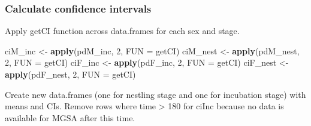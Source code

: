 \documentclass[]{article}
\newenvironment{Shaded}{\begin{snugshade}}{\end{snugshade}}
\newcommand{\DataTypeTok}[1]{\textcolor[rgb]{0.13,0.29,0.53}{#1}}
\newcommand{\DecValTok}[1]{\textcolor[rgb]{0.00,0.00,0.81}{#1}}
\newcommand{\KeywordTok}[1]{\textcolor[rgb]{0.13,0.29,0.53}{\textbf{#1}}}
\newcommand{\NormalTok}[1]{#1}
\newcommand{\StringTok}[1]{\textcolor[rgb]{0.31,0.60,0.02}{#1}}
\begin{document}
\hypertarget{calculate-confidence-intervals}{%
\subsubsection{Calculate confidence
intervals}\label{calculate-confidence-intervals}}

Apply getCI function across data.frames for each sex and stage.

\begin{Shaded}
\begin{Highlighting}[]
\NormalTok{ciM_inc <-}\StringTok{ }\KeywordTok{apply}\NormalTok{(pdM_inc, }\DecValTok{2}\NormalTok{, }\DataTypeTok{FUN =}\NormalTok{ getCI)}
\NormalTok{ciM_nest <-}\StringTok{ }\KeywordTok{apply}\NormalTok{(pdM_nest, }\DecValTok{2}\NormalTok{, }\DataTypeTok{FUN =}\NormalTok{ getCI)}
\NormalTok{ciF_inc <-}\StringTok{ }\KeywordTok{apply}\NormalTok{(pdF_inc, }\DecValTok{2}\NormalTok{, }\DataTypeTok{FUN =}\NormalTok{ getCI)}
\NormalTok{ciF_nest <-}\StringTok{ }\KeywordTok{apply}\NormalTok{(pdF_nest, }\DecValTok{2}\NormalTok{, }\DataTypeTok{FUN =}\NormalTok{ getCI)}
\end{Highlighting}
\end{Shaded}

Create new data.frames (one for nestling stage and one for incubation
stage) with means and CIs. Remove rows where time \textgreater{} 180 for
ciInc because no data is available for MGSA after this time.
\end{document}

